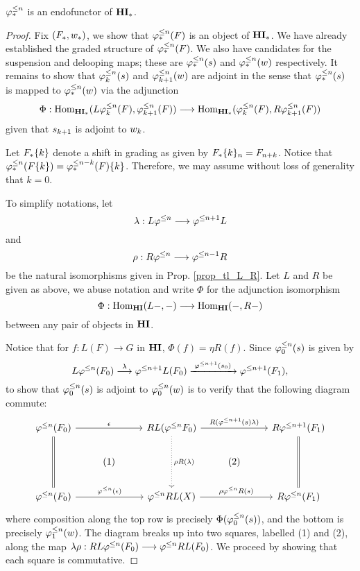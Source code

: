 \begin{lem}\label{lem_tlHM_is_functor}
$\tlHM{n}$ is an endofunctor of $\HM$.
\end{lem}

\begin{proof}
Fix $(F_*, \deloop_*)$, we show that $\tlHM{n}(F)$ is an object of
$\HM$. We have already established the graded structure of 
$\tlHM{n}(F)$. We also have candidates for the suspension and 
delooping maps; these are $\suspTL{n}$ and $\deloopTL{n}$ 
respectively. It remains to show that $\suspTL[k]{n}$ and 
$\deloopTL[k + 1]{n}$ are adjoint in the sense that $\suspTL{n}$ is 
mapped to $\deloopTL{n}$ via the adjunction 
\[
\Phi: \homHM(L \tlHM[k]{n}(F), \tlHM[k + 1]{n}(F))
\to \homHM(\tlHM[k]{n}(F), R \tlHM[k + 1]{n}(F))
\]
given that $\susp_{k + 1}$ is adjoint to $\deloop_k$.

Let $\shift[k]{F_*}$ denote a shift in grading as given 
by $\shift[k]{F_*}_n = F_{n + k}$. Notice that 
$\tlHM{n}(\shift[k]{F}) = \shift[k]{\tlHM{n - k}(F)}$. Therefore, 
we may assume without loss of generality that $k = 0$. 

To simplify notations, let
\[
\lambda : L\tlHI{n} \to \tlHI{n + 1}L
\]
and 
\[
\rho : R\tlHI{n} \to \tlHI{n - 1}R
\]
be the natural isomorphisms given in Prop. \ref{prop_tl_L_R}. 
Let $L$ and $R$ be given as above,  we abuse notation and write $\Phi$ for the 
adjunction isomorphism
\[
\Phi: \homHI(L-, -) \to \homHI(-,R-)
\]
between any pair of objects in $\HI$.

Notice that for $f: L(F) \to G$ in $\HI$, $\Phi(f) = \eta R(f)$.
Since $\suspTL[0]{n}$ is given by
\[
L\tlHI{n}(F_0) \stackrel{\lambda}{\to} \tlHI{n + 1} L(F_0)
   \xrightarrow{\;\tlHI{n + 1}(\susp_0)\;} \tlHI{n + 1}(F_1),
\]
to show that $\suspTL[0]{n}$ is adjoint to $\deloopTL[0]{n}$ is to
verify that the following diagram commute:
\[
\begin{tikzcd}
\tlHI{n}(F_0) \arrow{rr}{\epsilon} \arrow[equals]{dd} &&
RL (\tlHI{n}F_0) \arrow{rr}{R(\tlHI{n + 1}(\susp) \lambda)} 
\arrow[dotted]{dd}{\rho R(\lambda)}&&
R \tlHI{n + 1} (F_1) \arrow[equals]{dd} \\
& (1) && (2) \\
\tlHI{n}(F_0) \arrow{rr}{\tlHI{n}(\epsilon)} &&
\tlHI{n} RL(X) \arrow{rr}{\rho \tlHI{n} R(\susp)} &&
R\tlHI{n}(F_1)
\end{tikzcd}
\]
where composition along the top row is precisely 
$\Phi(\suspTL[0]{n})$, and the bottom is precisely 
$\deloopTL[1]{n}$. The diagram breaks up into two squares,
labelled (1) and (2), along the map $\lambda \rho: RL 
\tlHI{n}(F_0) \to \tlHI{n} RL(F_0)$. We proceed by showing that 
each square is commutative.


\end{proof}
